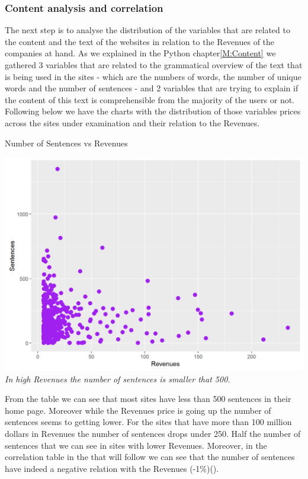 \documentclass{book}
\begin{document}
\subsubsection{Content analysis and correlation}
The next step is to analyse the distribution of the variables that are related to the content and the text of the websites in relation to the Revenues of the companies at hand. As we explained in the Python chapter\ref{M:Content} we gathered 3 variables that are related to the grammatical overview of the text that is being used in the sites - which are the numbers of words, the number of unique words and the number of sentences - and 2 variables that are trying to explain if the content of this text is comprehensible from the majority of the users or not. Following below we have the charts with the distribution of those variables prices across the sites under examination and their relation to the Revenues.
\begin{table}[H]
\centering
\caption{Number of Sentences vs Revenues}
\begin{center}
\includegraphics[scale=0.4]{../R/photos/33_sent_rev.png}  \\
\textit{In high Revenues the number of sentences is smaller that 500.}
\end{center}
\end{table}
From the table we can see that most sites have less than 500 sentences in their home page. Moreover while the Revenues price is going up the number of sentences seems to getting lower. For the sites that have more than 100 million dollars in Revenues the number of sentences drops under 250. Half the number of sentences that we can see in sites with lower Revenues. Moreover, in the correlation table in the that will follow we can see that the number of sentences have indeed a negative relation with the Revenues (-1\%)(\pageref{lod}).
\end{document}
